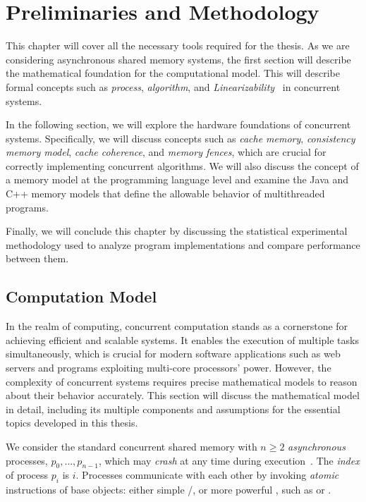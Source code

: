 \chapter{\label{chapter:3_preliminaries}Preliminaries and Methodology}

This chapter will cover all the necessary tools required for the thesis. As we are considering asynchronous shared memory systems, the first section will describe the mathematical foundation for the computational model. This will describe formal concepts such as \emph{process}, \emph{algorithm}, and \emph{Linearizability}~\cite{DBLP_journals_toplas_HerlihyW90} in concurrent systems.

In the following section, we will explore the hardware foundations of concurrent systems. Specifically, we will discuss concepts such as \emph{cache memory}, \emph{consistency memory model}, \emph{cache coherence}, and \emph{memory fences}, which are crucial for correctly implementing concurrent algorithms. We will also discuss the concept of a memory model at the programming language level and examine the Java and C++ memory models that define the allowable behavior of multithreaded programs.

Finally, we will conclude this chapter by discussing the statistical experimental methodology used to analyze program implementations and compare performance between them.

\section{\label{sec:chapter-3:computation-model}Computation Model}

In the realm of computing, concurrent computation stands as a cornerstone for achieving efficient and scalable systems. It enables the execution of multiple tasks simultaneously, which is crucial for modern software applications such as web servers and programs exploiting multi-core processors' power. However, the complexity of concurrent systems requires precise mathematical models to reason about their behavior accurately. This section will discuss the mathematical model in detail, including its multiple components and assumptions for the essential topics developed in this thesis.

We consider the standard concurrent shared memory with \(n \ge 2\) \textit{asynchronous} processes, \(p_0, \ldots, p_{n-1}\), which may \textit{crash} at any time during execution~\cite{DBLP_conf_spaa_Herlihy91,DBLP_books_daglib_0020056,DBLP_journals_toplas_HerlihyW90}. The \textit{index} of process \(p_i\) is \(i\). Processes communicate with each other by invoking \textit{atomic} instructions of base objects: either simple \R/\W, or more powerful \RMW, such as \SWAP or \CAS.

